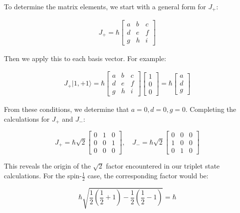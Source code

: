 \documentclass[italian]{HKNdocument}
\begin{document}
To determine the matrix elements, we start with a general form for $J_+$:

\begin{gather}
J_{+}=\hbar\left[\begin{array}{lll}
a & b & c \\
d & e & f \\
g & h & i
\end{array}\right]
\end{gather}

Then we apply this to each basis vector. For example:

\begin{gather}
J_{+}|1,+1\rangle=\hbar\left[\begin{array}{lll}
a & b & c \\
d & e & f \\
g & h & i
\end{array}\right]\left[\begin{array}{l}
1 \\
0 \\
0
\end{array}\right]=\hbar\left[\begin{array}{l}
a \\
d \\
g
\end{array}\right]
\end{gather}


From these conditions, we determine that $a=0, d=0, g=0$. Completing the calculations for $J_+$ and $J_-$:

\[
J_{+}=\hbar \sqrt{2}\left[\begin{array}{lll}
0 & 1 & 0  \\
0 & 0 & 1 \\
0 & 0 & 0
\end{array}\right], \quad J_{-}=\hbar \sqrt{2}\left[\begin{array}{lll}
0 & 0 & 0 \\
1 & 0 & 0 \\
0 & 1 & 0
\end{array}\right]
\]

This reveals the origin of the $\sqrt{2}$ factor encountered in our triplet state calculations. For the spin-$\frac{1}{2}$ case, the corresponding factor would be:

\begin{equation}
\hbar \sqrt{\frac{1}{2}(\frac{1}{2}+1)-\frac{1}{2}(\frac{1}{2}-1)}=\hbar
\end{equation}
\end{document}
